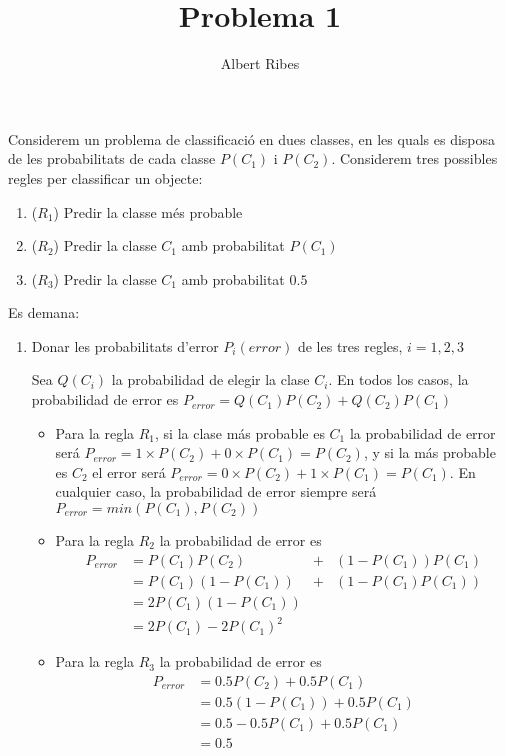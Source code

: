\documentclass[a4paper]{article}
\author{Albert Ribes}
\title{Problema 1}
\begin{document}
  \maketitle
  Considerem un problema de classificació en dues classes, en les quals es disposa de les probabilitats de
  cada classe $P(C_1)$ i $P(C_2)$. Considerem tres possibles regles per classificar un objecte:
  \begin{enumerate}
    \item ($R_1$) Predir la classe més probable
    \item ($R_2$) Predir la classe $C_1$ amb probabilitat $P(C_1)$
    \item ($R_3$) Predir la classe $C_1$ amb probabilitat $0.5$
  \end{enumerate}
  Es demana:
  \begin{enumerate}
    \item Donar les probabilitats d'error $P_i(error)$ de les tres regles, $i = 1, 2, 3$
    {\bfseries

    Sea $Q(C_i)$ la probabilidad de elegir la clase $C_i$. En todos los casos, la probabilidad de error es $P_{error} = Q(C_1)P(C_2) + Q(C_2)P(C_1)$

    \begin{itemize}
        \item Para la regla $R_1$, si la clase más probable es $C_1$ la probabilidad de error será $P_{error} = 1 \times P(C_2) + 0 \times P(C_1) = P(C_2)$, y si la más probable es $C_2$ el error será $P_{error} = 0 \times P(C_2) + 1 \times P(C_1) = P(C_1)$. En cualquier caso, la probabilidad de error siempre será $P_{error} = min(P(C_1), P(C_2))$
        \item Para la regla $R_2$ la probabilidad de error es
            \begin{align*}
                P_{error} & = P(C_1)P(C_2) & + & (1 - P(C_1))P(C_1) \\
                & = P(C_1)(1 - P(C_1)) & + & (1 - P(C_1)P(C_1)) \\
                & = 2P(C_1)(1 - P(C_1)) & \\
                & = 2P(C_1) - 2P(C_1)^2 &
            \end{align*}
        \item Para la regla $R_3$ la probabilidad de error es
            \begin{align*}
                P_{error} &= 0.5P(C_2) + 0.5P(C_1) \\
                &= 0.5(1 - P(C_1)) + 0.5P(C_1) \\
                &= 0.5 - 0.5P(C_1) + 0.5P(C_1) \\
                &= 0.5
            \end{align*}







\end{itemize}}
\end{enumerate}
\end{document}
